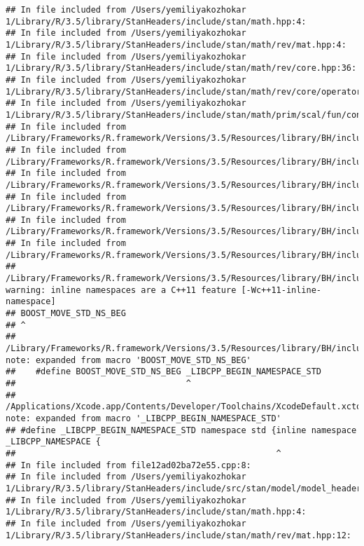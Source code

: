 \documentclass[]{article}
\begin{document}
\begin{verbatim}
## In file included from /Users/yemiliyakozhokar 1/Library/R/3.5/library/StanHeaders/include/stan/math.hpp:4:
## In file included from /Users/yemiliyakozhokar 1/Library/R/3.5/library/StanHeaders/include/stan/math/rev/mat.hpp:4:
## In file included from /Users/yemiliyakozhokar 1/Library/R/3.5/library/StanHeaders/include/stan/math/rev/core.hpp:36:
## In file included from /Users/yemiliyakozhokar 1/Library/R/3.5/library/StanHeaders/include/stan/math/rev/core/operator_unary_plus.hpp:7:
## In file included from /Users/yemiliyakozhokar 1/Library/R/3.5/library/StanHeaders/include/stan/math/prim/scal/fun/constants.hpp:4:
## In file included from /Library/Frameworks/R.framework/Versions/3.5/Resources/library/BH/include/boost/math/constants/constants.hpp:13:
## In file included from /Library/Frameworks/R.framework/Versions/3.5/Resources/library/BH/include/boost/math/tools/convert_from_string.hpp:15:
## In file included from /Library/Frameworks/R.framework/Versions/3.5/Resources/library/BH/include/boost/lexical_cast.hpp:32:
## In file included from /Library/Frameworks/R.framework/Versions/3.5/Resources/library/BH/include/boost/lexical_cast/try_lexical_convert.hpp:42:
## In file included from /Library/Frameworks/R.framework/Versions/3.5/Resources/library/BH/include/boost/lexical_cast/detail/converter_lexical.hpp:52:
## In file included from /Library/Frameworks/R.framework/Versions/3.5/Resources/library/BH/include/boost/container/container_fwd.hpp:61:
## /Library/Frameworks/R.framework/Versions/3.5/Resources/library/BH/include/boost/container/detail/std_fwd.hpp:27:1: warning: inline namespaces are a C++11 feature [-Wc++11-inline-namespace]
## BOOST_MOVE_STD_NS_BEG
## ^
## /Library/Frameworks/R.framework/Versions/3.5/Resources/library/BH/include/boost/move/detail/std_ns_begin.hpp:18:34: note: expanded from macro 'BOOST_MOVE_STD_NS_BEG'
##    #define BOOST_MOVE_STD_NS_BEG _LIBCPP_BEGIN_NAMESPACE_STD
##                                  ^
## /Applications/Xcode.app/Contents/Developer/Toolchains/XcodeDefault.xctoolchain/usr/include/c++/v1/__config:390:52: note: expanded from macro '_LIBCPP_BEGIN_NAMESPACE_STD'
## #define _LIBCPP_BEGIN_NAMESPACE_STD namespace std {inline namespace _LIBCPP_NAMESPACE {
##                                                    ^
## In file included from file12ad02ba72e55.cpp:8:
## In file included from /Users/yemiliyakozhokar 1/Library/R/3.5/library/StanHeaders/include/src/stan/model/model_header.hpp:4:
## In file included from /Users/yemiliyakozhokar 1/Library/R/3.5/library/StanHeaders/include/stan/math.hpp:4:
## In file included from /Users/yemiliyakozhokar 1/Library/R/3.5/library/StanHeaders/include/stan/math/rev/mat.hpp:12:

\end{verbatim}
\end{document}
